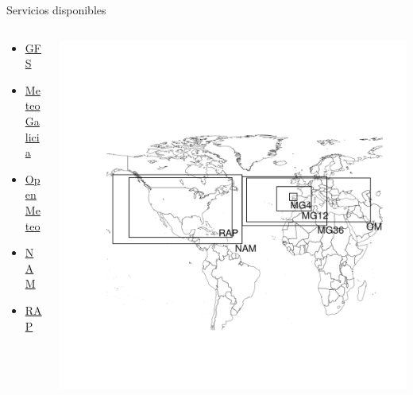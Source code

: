 \documentclass[xcolor={usenames,svgnames,dvipsnames}]{beamer}
\begin{document}
\begin{frame}[label=sec-1-2]{Servicios disponibles}
\begin{columns}
\begin{column}{0.32\textwidth}

\begin{itemize}
\item \href{http://www.emc.ncep.noaa.gov/index.php?branch=GFS}{GFS}
\item \href{http://www.meteogalicia.es/web/modelos/threddsIndex.action}{MeteoGalicia}
\item \href{https://openmeteoforecast.org/}{OpenMeteo}
\item \href{http://www.ncdc.noaa.gov/data-access/model-data/model-datasets/north-american-mesoscale-forecast-system-nam}{NAM}
\item \href{http://www.ncdc.noaa.gov/data-access/model-data/model-datasets/rapid-refresh-rap}{RAP}
\end{itemize}
\end{column}
\begin{column}{0.7\textwidth}
\includegraphics[width=.9\linewidth]{figs/mapaServices.png}
\end{column}
\end{columns}
\end{frame}
\end{document}
